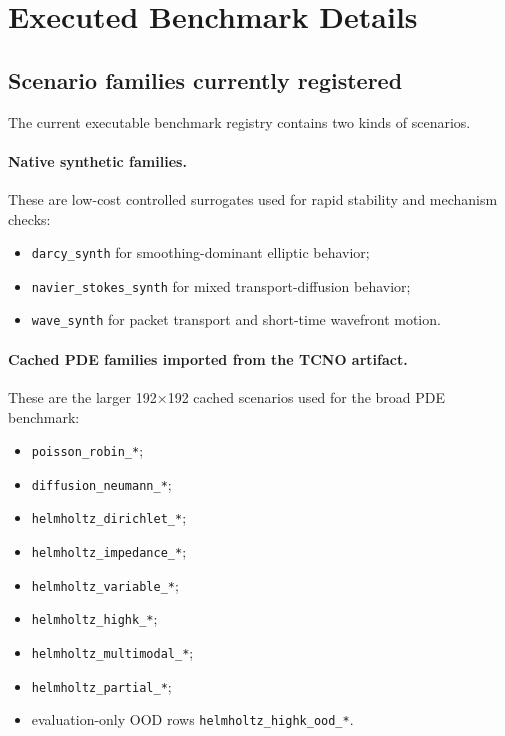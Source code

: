 \section{Executed Benchmark Details}
\label{app:benchmarks}

\subsection{Scenario families currently registered}

The current executable benchmark registry contains two kinds of scenarios.

\paragraph{Native synthetic families.}
These are low-cost controlled surrogates used for rapid stability and mechanism checks:
\begin{itemize}
\item \texttt{darcy\_synth} for smoothing-dominant elliptic behavior;
\item \texttt{navier\_stokes\_synth} for mixed transport-diffusion behavior;
\item \texttt{wave\_synth} for packet transport and short-time wavefront motion.
\end{itemize}

\paragraph{Cached PDE families imported from the TCNO artifact.}
These are the larger 192$\times$192 cached scenarios used for the broad PDE benchmark:
\begin{itemize}
\item \texttt{poisson\_robin\_*};
\item \texttt{diffusion\_neumann\_*};
\item \texttt{helmholtz\_dirichlet\_*};
\item \texttt{helmholtz\_impedance\_*};
\item \texttt{helmholtz\_variable\_*};
\item \texttt{helmholtz\_highk\_*};
\item \texttt{helmholtz\_multimodal\_*};
\item \texttt{helmholtz\_partial\_*};
\item evaluation-only OOD rows \texttt{helmholtz\_highk\_ood\_*}.
\end{itemize}

